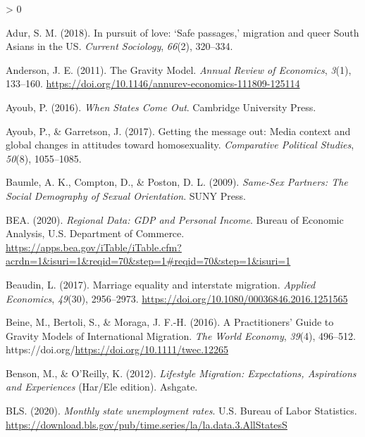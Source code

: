 \documentclass[
  11pt,
]{article}
\newlength{\cslhangindent}
\newenvironment{CSLReferences}[2] %
 {%
  \setlength{\parindent}{0pt}
  \ifodd #1 \everypar{\setlength{\hangindent}{\cslhangindent}}\ignorespaces\fi
  \ifnum #2 > 0
  \setlength{\parskip}{#2\baselineskip}
  \fi
 }%
 {}
\begin{document}
\noindent

\hypertarget{refs}{}
\begin{CSLReferences}{1}{0}
\leavevmode\hypertarget{ref-adur_2018}{}%
Adur, S. M. (2018). In pursuit of love: {`{Safe} passages,'} migration and queer {South} {Asians} in the {US}. \emph{Current Sociology}, \emph{66}(2), 320--334.

\leavevmode\hypertarget{ref-anderson_2011}{}%
Anderson, J. E. (2011). The {Gravity} {Model}. \emph{Annual Review of Economics}, \emph{3}(1), 133--160. \url{https://doi.org/10.1146/annurev-economics-111809-125114}

\leavevmode\hypertarget{ref-ayoub_2016}{}%
Ayoub, P. (2016). \emph{When {States} {Come} {Out}}. Cambridge University Press.

\leavevmode\hypertarget{ref-ayoub_2017}{}%
Ayoub, P., \& Garretson, J. (2017). Getting the message out: {Media} context and global changes in attitudes toward homosexuality. \emph{Comparative Political Studies}, \emph{50}(8), 1055--1085.

\leavevmode\hypertarget{ref-baumle_2009}{}%
Baumle, A. K., Compton, D., \& Poston, D. L. (2009). \emph{Same-{Sex} {Partners}: {The} {Social} {Demography} of {Sexual} {Orientation}}. SUNY Press.

\leavevmode\hypertarget{ref-bea_2020}{}%
BEA. (2020). \emph{Regional {Data}: {GDP} and {Personal} {Income}}. Bureau of Economic Analysis, U.S. Department of Commerce. \url{https://apps.bea.gov/iTable/iTable.cfm?acrdn=1\&isuri=1\&reqid=70\&step=1\#reqid=70\&step=1\&isuri=1}

\leavevmode\hypertarget{ref-beaudin_2017}{}%
Beaudin, L. (2017). Marriage equality and interstate migration. \emph{Applied Economics}, \emph{49}(30), 2956--2973. \url{https://doi.org/10.1080/00036846.2016.1251565}

\leavevmode\hypertarget{ref-beine_2016}{}%
Beine, M., Bertoli, S., \& Moraga, J. F.-H. (2016). A {Practitioners}' {Guide} to {Gravity} {Models} of {International} {Migration}. \emph{The World Economy}, \emph{39}(4), 496--512. https://doi.org/\url{https://doi.org/10.1111/twec.12265}

\leavevmode\hypertarget{ref-benson_2012}{}%
Benson, M., \& O'Reilly, K. (2012). \emph{Lifestyle {Migration}: {Expectations}, {Aspirations} and {Experiences}} (Har/Ele edition). Ashgate.

\leavevmode\hypertarget{ref-bls_2020}{}%
BLS. (2020). \emph{Monthly state unemployment rates}. U.S. Bureau of Labor Statistics. \url{https://download.bls.gov/pub/time.series/la/la.data.3.AllStatesS}


\end{CSLReferences}
\end{document}
